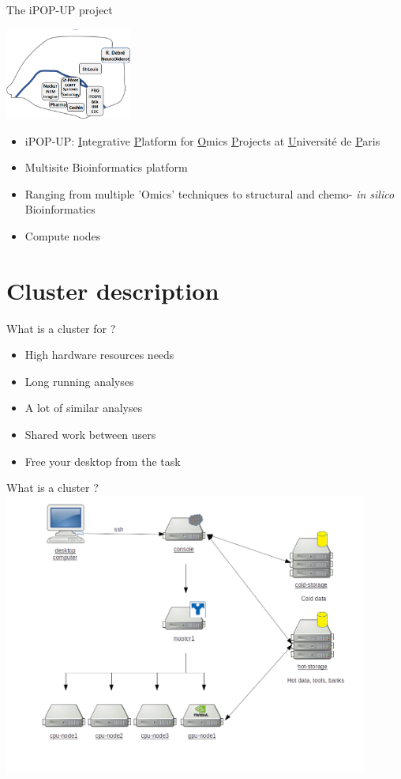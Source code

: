 \documentclass{beamer}
\begin{document}
\begin{frame}[fragile]{The iPOP-UP project}
\begin{center}
    \includegraphics[height = 3cm]{Images/multisite.png}   
\end{center}
\begin{itemize}
    \item iPOP-UP: \underline{I}ntegrative \underline{P}latform for \underline{O}mics \underline{P}rojects at \underline{U}niversité de \underline{P}aris
    \item Multisite Bioinformatics platform
    \item Ranging from multiple 'Omics' techniques to structural and chemo- \emph{in silico} Bioinformatics
    \item Compute nodes
\end{itemize}
\end{frame}

\section{Cluster description}
\begin{frame}{What is a cluster for ?}
    \begin{itemize}
        \item High hardware resources needs
        \item Long running analyses
        \item A lot of similar analyses
        \item Shared work between users
        \item Free your desktop from the task
    \end{itemize}
\end{frame}


\begin{frame}{What is a cluster ?}
\centering
\includegraphics[keepaspectratio=True, width =0.9\textwidth]{Images/architecture.png}
\end{frame}
\end{document}
